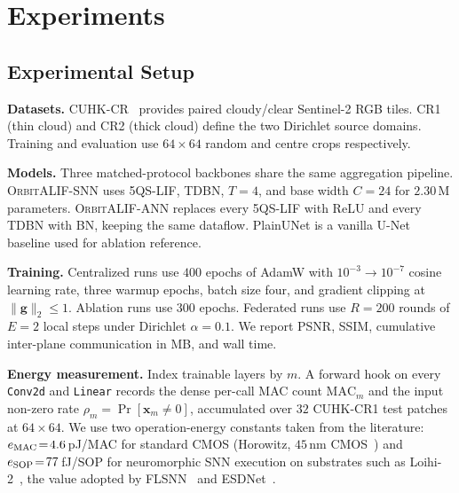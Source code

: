 \documentclass[conference]{IEEEtran}
\newcommand{\OrbitALIF}{\textsc{OrbitALIF}}
\newcommand{\FQS}{5QS}
\begin{document}
\section{Experiments}\label{sec:experiments}

\subsection{Experimental Setup}\label{sec:exp-setup}

\textbf{Datasets.} CUHK-CR~\cite{ref:cuhkcr} provides paired
cloudy/clear Sentinel-2 RGB tiles. CR1 (thin cloud) and CR2 (thick
cloud) define the two Dirichlet source domains. Training and
evaluation use $64\!\times\!64$ random and centre crops
respectively.

\textbf{Models.} Three matched-protocol backbones share the same
aggregation pipeline. \OrbitALIF{}-SNN uses \FQS{}-LIF, TDBN,
$T\!=\!4$, and base width $C\!=\!24$ for $2.30$\,M parameters.
\OrbitALIF{}-ANN replaces every \FQS{}-LIF with ReLU and every TDBN
with BN, keeping the same dataflow. PlainUNet is a vanilla U-Net
baseline used for ablation reference.

\textbf{Training.} Centralized runs use $400$ epochs of AdamW with
$10^{-3}\!\to\!10^{-7}$ cosine learning rate, three warmup epochs,
batch size four, and gradient clipping at $\|\mathbf{g}\|_2\!\le\!1$.
Ablation runs use $300$ epochs. Federated runs use $R\!=\!200$
rounds of $E\!=\!2$ local steps under Dirichlet
$\alpha\!=\!0.1$. We report PSNR, SSIM, cumulative inter-plane
communication in MB, and wall time.

\textbf{Energy measurement.} Index trainable layers by $m$. A
forward hook on every \texttt{Conv2d} and \texttt{Linear} records
the dense per-call MAC count $\mathrm{MAC}_m$ and the input non-zero
rate $\rho_m\!=\!\Pr[\mathbf{x}_m\!\neq\!0]$, accumulated over $32$
CUHK-CR1 test patches at $64\!\times\!64$. We use two
operation-energy constants taken from the literature:
$e_{\rm MAC}\!=\!4.6$\,pJ/MAC for standard CMOS (Horowitz, $45$\,nm
CMOS~\cite{ref:horowitz2014}) and $e_{\rm SOP}\!=\!77$\,fJ/SOP for
neuromorphic SNN execution on substrates such as
Loihi-2~\cite{ref:loihi}, the value adopted by
FLSNN~\cite{ref:flsnn} and ESDNet~\cite{ref:esdnet}.
\end{document}
